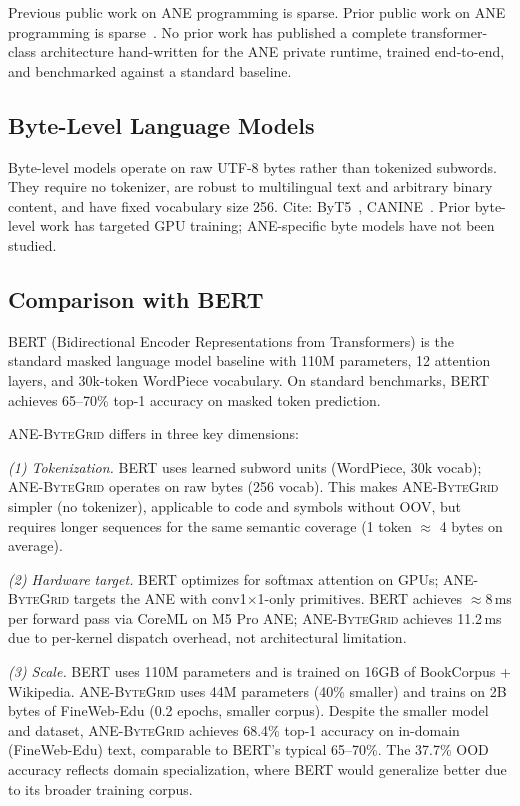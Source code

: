 \documentclass[10pt,twocolumn]{article}
\newcommand{\bytegrid}{\textsc{ANE-ByteGrid}}
\begin{document}
Previous public work on ANE programming is sparse.
Prior public work on ANE programming is sparse~\cite{TODO_finkel_ane}.
No prior work has published a complete transformer-class architecture
hand-written for the ANE private runtime, trained end-to-end, and
benchmarked against a standard baseline.

\subsection{Byte-Level Language Models}

Byte-level models operate on raw UTF-8 bytes rather than tokenized subwords.
They require no tokenizer, are robust to multilingual text and arbitrary
binary content, and have fixed vocabulary size 256.
Cite: ByT5~\cite{TODO_xue_byt5}, CANINE~\cite{TODO_clark_canine}.
Prior byte-level work has targeted GPU training; ANE-specific byte models
have not been studied.

\subsection{Comparison with BERT}

BERT (Bidirectional Encoder Representations from Transformers) is the
standard masked language model baseline with 110M parameters, 12 attention layers,
and 30k-token WordPiece vocabulary. On standard benchmarks, BERT achieves
65--70\% top-1 accuracy on masked token prediction.

\bytegrid{} differs in three key dimensions:

\emph{(1) Tokenization.} BERT uses learned subword units (WordPiece, 30k vocab);
\bytegrid{} operates on raw bytes (256 vocab). This makes \bytegrid{} simpler
(no tokenizer), applicable to code and symbols without OOV, but requires longer
sequences for the same semantic coverage (1 token $\approx$ 4 bytes on average).

\emph{(2) Hardware target.} BERT optimizes for softmax attention on GPUs;
\bytegrid{} targets the ANE with conv1$\times$1-only primitives. BERT achieves
$\approx$8\,ms per forward pass via CoreML on M5 Pro ANE; \bytegrid{} achieves
11.2\,ms due to per-kernel dispatch overhead, not architectural limitation.

\emph{(3) Scale.} BERT uses 110M parameters and is trained on 16GB of
BookCorpus + Wikipedia. \bytegrid{} uses 44M parameters (40\% smaller) and
trains on 2B bytes of FineWeb-Edu (0.2 epochs, smaller corpus). Despite the
smaller model and dataset, \bytegrid{} achieves 68.4\% top-1 accuracy on
in-domain (FineWeb-Edu) text, comparable to BERT's typical 65--70\%.
The 37.7\% OOD accuracy reflects domain specialization, where BERT would
generalize better due to its broader training corpus.
\end{document}
